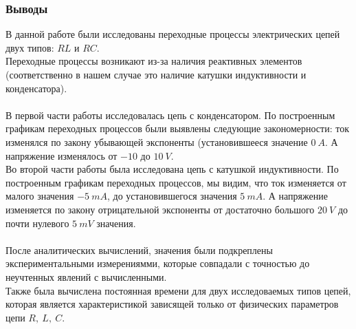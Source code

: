 \documentclass[12pt]{article}
\begin{document}
\subsubsection*{Выводы}
В данной работе были исследованы переходные процессы электрических цепей двух типов: $RL$ и $RC$. \\
Переходные процессы возникают из-за наличия реактивных элементов (соответственно в нашем случае это наличие катушки индуктивности и конденсатора). \\
\ \\
В первой части работы исследовалась цепь с конденсатором. По построенным графикам переходных процессов были выявлены следующие закономерности: ток изменялся по закону убывающей экспоненты (установившееся значение $0 \ A$. А напряжение изменялось от $-10$ до $10 \ V$.
\ \\
Во второй части работы была исследована цепь с катушкой индуктивности. По построенным графикам переходных процессов, мы видим, что ток изменяется от малого значения $-5 \ mA$, до установившегося значения $5\ mA$. А напряжение изменяется по закону отрицательной экспоненты от достаточно большого $20 \ V$ до почти нулевого $5 \ mV$ значения. \\
\ \\
После аналитических вычислений, значения были подкреплены экспериментальными измерениямми, которые совпадали с точностью до неучтенных явлений с вычисленными. \\
Также была вычислена постоянная времени для двух исследоваемых типов цепей, которая является характеристикой зависящей только от физических параметров цепи $R, \ L, \ C$.
\end{document}
